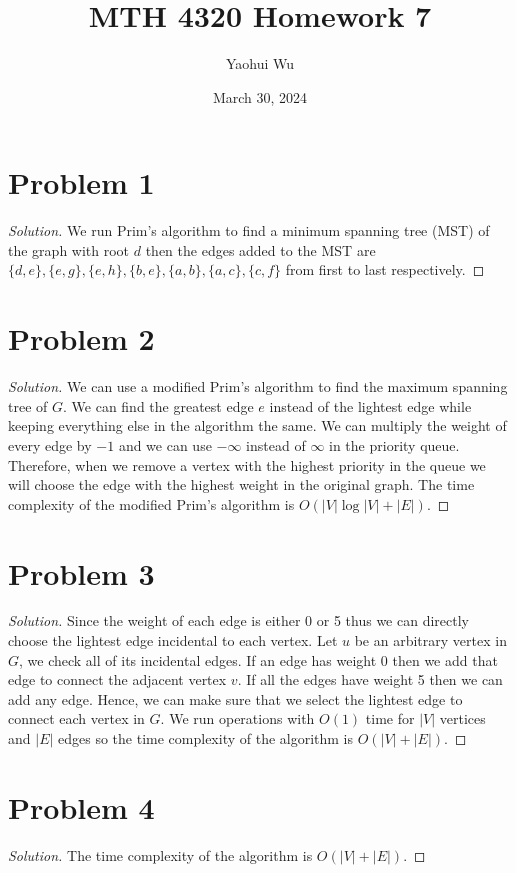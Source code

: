 \documentclass[12pt]{article}
\title{MTH 4320 Homework 7}
\author{Yaohui Wu}
\date{March 30, 2024}
\newenvironment*{solution}{\begin{proof}[Solution]}{\end{proof}}
\begin{document}
\maketitle
\section*{Problem 1}
\begin{solution}
    We run Prim's algorithm to find a minimum spanning tree (MST) of the graph
    with root \(d\) then the edges added to the MST are \(\{d,e\},\{e,g\},\{e,
    h\},\{b,e\},\{a,b\},\{a,c\},\{c,f\}\) from first to last respectively.
\end{solution}
\section*{Problem 2}
\begin{solution}
    We can use a modified Prim's algorithm to find the maximum spanning tree
    of \(G\). We can find the greatest edge \(e\) instead of the lightest edge
    while keeping everything else in the algorithm the same. We can multiply
    the weight of every edge by \(-1\) and we can use \(-\infty\) instead of
    \(\infty\) in the priority queue. Therefore, when we remove a vertex with
    the highest priority in the queue we will choose the edge with the highest
    weight in the original graph. The time complexity of the modified Prim's
    algorithm is \(O(|V|\log|V|+|E|)\).
\end{solution}
\section*{Problem 3}
\begin{solution}
    Since the weight of each edge is either 0 or 5 thus we can directly choose
    the lightest edge incidental to each vertex. Let \(u\) be an arbitrary
    vertex in \(G\), we check all of its incidental edges. If an edge has
    weight 0 then we add that edge to connect the adjacent vertex \(v\). If
    all the edges have weight 5 then we can add any edge. Hence, we can make
    sure that we select the lightest edge to connect each vertex in \(G\). We
    run operations with \(O(1)\) time for \(|V|\) vertices and \(|E|\) edges
    so the time complexity of the algorithm is \(O(|V|+|E|)\).
\end{solution}
\section*{Problem 4}
\begin{solution}
    The time complexity of the algorithm is \(O(|V|+|E|)\).
\end{solution}
\end{document}
